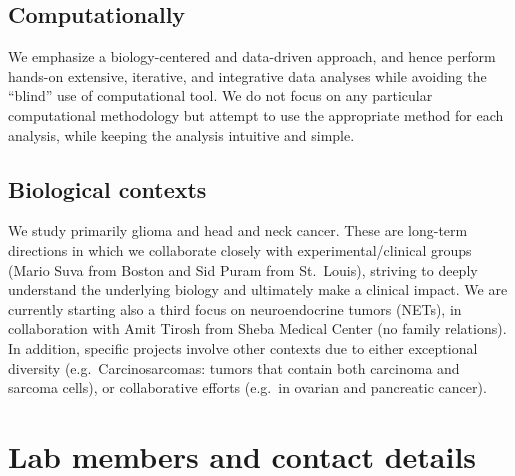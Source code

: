 \documentclass[
]{book}
\begin{document}
\hypertarget{computationally}{%
\section{Computationally}\label{computationally}}

We emphasize a biology-centered and data-driven approach, and hence perform hands-on extensive, iterative, and integrative data analyses while avoiding the ``blind'' use of computational tool. We do not focus on any particular computational methodology but attempt to use the appropriate method for each analysis, while keeping the analysis intuitive and simple.

\hypertarget{biological-contexts}{%
\section{Biological contexts}\label{biological-contexts}}

We study primarily glioma and head and neck cancer. These are long-term directions in which we collaborate closely with experimental/clinical groups (Mario Suva from Boston and Sid Puram from St.~Louis), striving to deeply understand the underlying biology and ultimately make a clinical impact. We are currently starting also a third focus on neuroendocrine tumors (NETs), in collaboration with Amit Tirosh from Sheba Medical Center (no family relations). In addition, specific projects involve other contexts due to either exceptional diversity (e.g.~Carcinosarcomas: tumors that contain both carcinoma and sarcoma cells), or collaborative efforts (e.g.~in ovarian and pancreatic cancer).

\hypertarget{contact}{%
\chapter{Lab members and contact details}\label{contact}}
\end{document}
